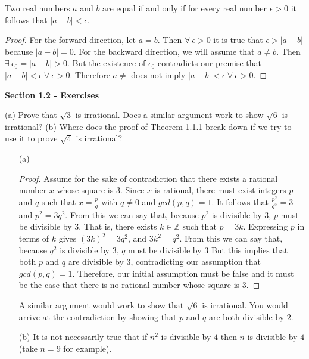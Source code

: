 \documentclass[11pt]{article}
\newcommand{\mytitlecompact}[1]{{

\hfill
{\Large \sffamily \bfseries{#1}}
\hfill
}}
\def\Z{{\mathbb{Z}}}
\newenvironment{thm}[1]
    {\renewcommand\theinnercustomthm{#1}\innercustomthm}
    {\endinnercustomthm}
\newenvironment{exer}[1]
    {\renewcommand\theinnercustomexer{#1}\innercustomexer\upshape}
    {\endinnercustomexer}
\begin{document}
\begin{thm}{1.2.6}
    Two real numbers $a$ and $b$ are equal if and only if for every real number $\epsilon>0$ it follows that $|a-b|<\epsilon$.
\end{thm}
\begin{proof}
    For the forward direction, let $a=b$. Then $\forall~\epsilon>0$ it is true that $\epsilon>|a-b|$ because $|a-b|=0$. For the backward direction, we will assume that $a\neq b$. Then $\exists~\epsilon_0=|a-b|>0$. But the existence of $\epsilon_0$ contradicts our premise that $|a-b|<\epsilon~\forall~\epsilon>0$. Therefore $a\neq$ does not imply $|a-b|<\epsilon~\forall~\epsilon>0$.
\end{proof}

\mytitlecompact{Section 1.2 - Exercises}

\begin{exer}{1.2.1} 
    (a) Prove that $\sqrt{3}$ is irrational. Does a similar argument work to show $\sqrt{6}$ is irrational? (b) Where does the proof of Theorem 1.1.1 break down if we try to use it to prove $\sqrt{4}$ is irrational?
    \begin{enumerate}
        \item[(a)] 
            \begin{proof}
                Assume for the sake of contradiction that there exists a rational number $x$ whose square is $3$. Since $x$ is rational, there must exist integers $p$ and $q$ such that $x=\frac{p}{q}$ with $q\neq 0$ and $gcd(p,q)=1$. It follows that $\frac{p^2}{q^2}=3$ and $p^2=3q^2$. From this we can say that, because $p^2$ is divisible by $3$, $p$ must be divisible by $3$. That is, there exists $k\in\Z$ such that $p=3k$. Expressing $p$ in terms of $k$ gives $(3k)^2=3q^2$, and $3k^2=q^2$. From this we can say that, because $q^2$ is divisible by $3$, $q$ must be divisible by $3$ But this implies that both $p$ and $q$ are divisible by $3$, contradicting our assumption that $gcd(p,q)=1$. Therefore, our initial assumption must be false and it must be the case that there is no rational number whose square is $3$.
            \end{proof} 
            A similar argument would work to show that $\sqrt{6}$ is irrational. You would arrive at the contradiction by showing that $p$ and $q$ are both divisible by $2$.
        \item[(b)]
            It is not necessarily true that if $n^2$ is divisible by $4$ then $n$ is divisible by $4$ (take $n=9$ for example).
    \end{enumerate}
\end{exer}
\end{document}
